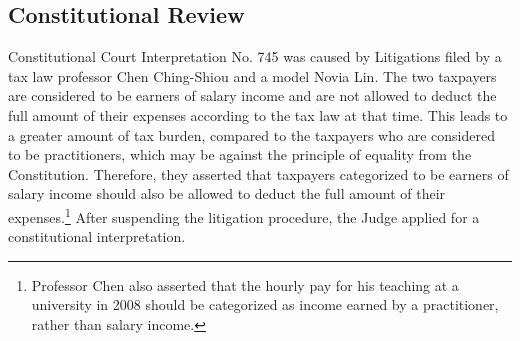 \documentclass[]{article}
\begin{document}




\subsection{Constitutional Review}


Constitutional Court Interpretation No. 745 was caused by Litigations filed by a tax law professor Chen Ching-Shiou
and a model Novia Lin.
The two taxpayers are considered to be earners of salary income and are not allowed to deduct the full amount of their expenses according to the tax law at that time. This leads to a greater amount of tax burden, compared to the taxpayers who are considered to be practitioners, which may be against the principle of equality from the Constitution.
Therefore, they asserted that taxpayers categorized to be earners of salary income should also be allowed to deduct the full amount of their expenses.\footnote{Professor Chen also asserted that the hourly pay for his teaching at a university in 2008 should be categorized as income earned by a practitioner, rather than salary income.}
After suspending the litigation procedure, the Judge applied for a constitutional interpretation.
\end{document}
